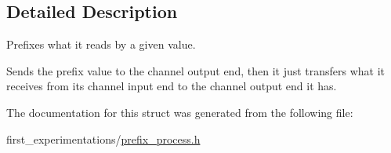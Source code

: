 \subsection{Detailed Description}
Prefixes what it reads by a given value. 

Sends the prefix value to the channel output end, then it just transfers what it receives from its channel input end to the channel output end it has. 

The documentation for this struct was generated from the following file\-:\begin{DoxyCompactItemize}
\item 
first\-\_\-experimentations/\hyperlink{prefix__process_8h}{prefix\-\_\-process.\-h}\end{DoxyCompactItemize}

